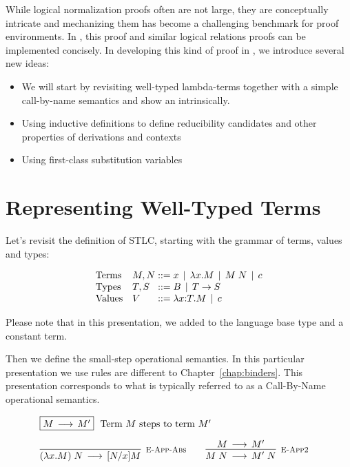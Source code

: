 While logical normalization proofs often are not large, they are
conceptually intricate and mechanizing them has become a challenging
benchmark for proof environments. In \beluga, this proof and similar
logical relations proofs can be implemented concisely. In developing
this kind of proof in \beluga, we introduce several new ideas:

\begin{itemize}
\item We will start by revisiting well-typed lambda-terms together with a
simple call-by-name semantics and show an intrinsically.

\item Using inductive definitions to define reducibility candidates
  and other properties of derivations and contexts

\item Using first-class substitution variables

\end{itemize}





\section{Representing Well-Typed Terms}

Let's revisit the definition of STLC, starting with the grammar of terms, values and types:

\[
\begin{array}{ll@{\bnfas}l}
\mbox{Terms} & M, N & x \bnfalt \lam x.M \bnfalt M \app N \bnfalt c\\
\mbox{Types} & T, S & B \bnfalt T \arrow S\\
\mbox{Values} & V & \lam x{:}T.M \bnfalt c
\end{array}
\]

Please note that in this presentation, we added to the language base
type and a constant term.

Then we define the small-step operational semantics. In this
particular presentation we use rules are different to
Chapter~\ref{chap:binders}. This presentation corresponds to what is
typically referred to as a Call-By-Name operational semantics.

\[
\begin{array}{c}
\multicolumn{1}{l}{\fbox{$M \Steps M'$}~~ \mbox{Term $M$ steps to term $M'$}}
\\[1em]
\infer[\EAppBeta]{(\lam x.M) \app N \Steps [N/x]M}{} \qquad
\infer[\EAppArgStep]{M \app N \Steps M'\;N}{M \Steps M'} \quad
\end{array}
\]

